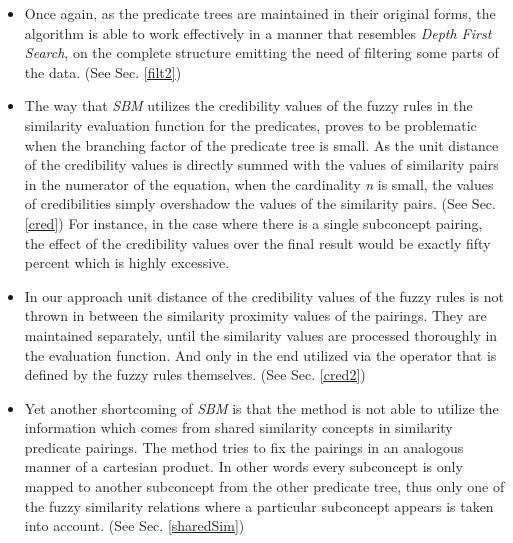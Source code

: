 \documentclass[egilmezThesis.tex]{subfiles}
\begin{document}
\renewcommand{\labelitemi}{$\diamond$}
\begin{itemize}
\item Once again, as the predicate trees are maintained in their original forms, the algorithm is able to work effectively in a manner that resembles \textit{Depth First Search}, on the  complete structure emitting the need of filtering some parts of the data. (See Sec. \ref{filt2})
\end{itemize}
\renewcommand{\labelitemi}{$\bullet$}
\begin{itemize}
\item The way that \textit{SBM} utilizes the credibility values of the fuzzy rules in the similarity evaluation function for the predicates, proves to be problematic when the branching factor of the predicate tree is small. As the unit distance of the credibility values is directly summed with the values of similarity pairs in the numerator of the equation, when the cardinality \textit{n} is small, the values of credibilities simply overshadow the values of the similarity pairs. (See Sec. \ref{cred}) For instance, in the case where there is a single subconcept pairing, the effect of the credibility values over the final result would be exactly fifty percent which is highly excessive.
\end{itemize}
\renewcommand{\labelitemi}{$\diamond$}
\begin{itemize}
\item In our approach unit distance of the credibility values of the fuzzy rules is not thrown in between the similarity proximity values of the pairings. They are maintained separately, until the similarity values are processed thoroughly in the evaluation function. And only in the end utilized via the operator that is defined by the fuzzy rules themselves. (See Sec. \ref{cred2})
\end{itemize}
\renewcommand{\labelitemi}{$\bullet$}
\begin{itemize}
\item Yet another shortcoming of \textit{SBM} is that the method is not able to utilize the information which comes from shared similarity concepts in similarity predicate pairings. The method tries to fix the pairings in an analogous manner of a cartesian product. In other words every subconcept is only mapped to another subconcept from the other predicate tree, thus only one of the fuzzy similarity relations where a particular subconcept appears is taken into account. (See Sec. \ref{sharedSim})
\end{itemize}
\end{document}
